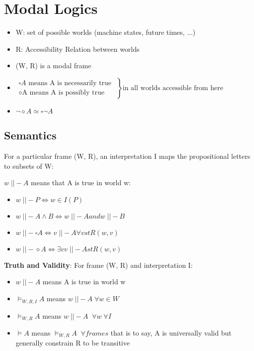 \documentclass{article}
\begin{document}
\section{Modal Logics}
\begin{itemize}
    \item W: set of possible worlds (machine states, future times, ...)
    \item R: Accessibility Relation between worlds
    
    \item (W, R) is a modal frame
    
    \item $
\left.\begin{array}{l}{\square A \text{ means A is} \text { necessarily true }} \\ {\diamond \text {A means A is possibly true }}\end{array}  \right\} \text{in all worlds accessible from here}
$

    \item $
\neg \diamond A \simeq \square \neg A
$
\end{itemize}

\subsection{Semantics}
For a particular frame (W, R), an interpretation I maps the propositional letters to subsets of W:

\bigskip
\noindent
$w \; ||\! - A$ means that A is true in world w:
\begin{itemize}
    \item $w \; ||\! - P \iff  w \in I(P)$
    \item $w \; ||\! - A \wedge B \iff w \; ||\! - A and w \; ||\! - B$
    \item $w \; ||\! -  \square A \iff v \; ||\! - A \forall v st R(w, v)$
    \item $w \; ||\! - \diamond A \iff \exists v  v \; ||\! - A st R(w, v)$
\end{itemize}

\bigskip
\noindent
\textbf{Truth and Validity}: For frame (W, R) and interpretation I:
\begin{itemize}
    \item $w \; ||\! - A$ means A is true in world w
    \item $\vDash_{W, R, I}A$ means $w \; ||\! - A \; \forall w \in W$
    \item $\vDash_{W, R}A$ means $w \; ||\! - A \; \; \forall w \; \forall I$
    \item $\vDash A$ means $\vDash_{W, R} A \; \; \forall frames$ that is to say, A is universally valid but generally constrain R to be transitive
\end{itemize}
\end{document}
